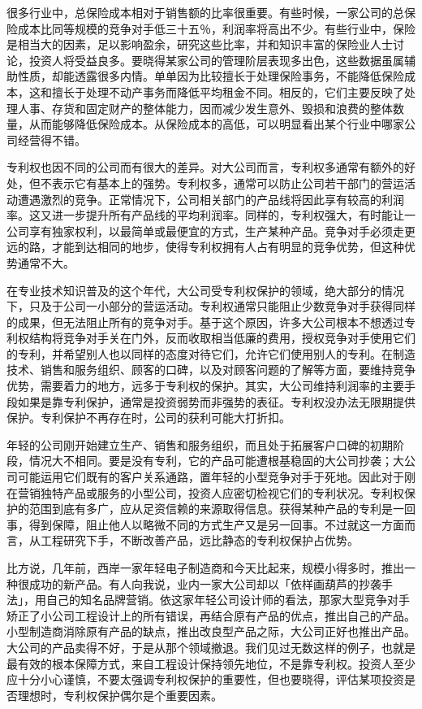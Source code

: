 \documentclass[UTF8,a4paper,zihao=-4,fontset = windows]{ctexart} %
\begin{document}
很多行业中，总保险成本相对于销售额的比率很重要。有些时候，一家公司的总保险成本比同等规模的竞争对手低三十五％，利润率将高出不少。有些行业中，保险是相当大的因素，足以影响盈余，研究这些比率，并和知识丰富的保险业人士讨论，投资人将受益良多。要晓得某家公司的管理阶层表现多出色，这些数据虽属辅助性质，却能透露很多内情。单单因为比较擅长于处理保险事务，不能降低保险成本，这和擅长于处理不动产事务而降低平均租金不同。相反的，它们主要反映了处理人事、存货和固定财产的整体能力，因而减少发生意外、毁损和浪费的整体数量，从而能够降低保险成本。从保险成本的高低，可以明显看出某个行业中哪家公司经营得不错。

专利权也因不同的公司而有很大的差异。对大公司而言，专利权多通常有额外的好处，但不表示它有基本上的强势。专利权多，通常可以防止公司若干部门的营运活动遭遇激烈的竞争。正常情况下，公司相关部门的产品线将因此享有较高的利润率。这又进一步提升所有产品线的平均利润率。同样的，专利权强大，有时能让一公司享有独家权利，以最简单或最便宜的方式，生产某种产品。竞争对手必须走更远的路，才能到达相同的地步，使得专利权拥有人占有明显的竞争优势，但这种优势通常不大。

在专业技术知识普及的这个年代，大公司受专利权保护的领域，绝大部分的情况下，只及于公司一小部分的营运活动。专利权通常只能阻止少数竞争对手获得同样的成果，但无法阻止所有的竞争对手。基于这个原因，许多大公司根本不想透过专利权结构将竞争对手关在门外，反而收取相当低廉的费用，授权竞争对手使用它们的专利，并希望别人也以同样的态度对待它们，允许它们使用别人的专利。在制造技术、销售和服务组织、顾客的口碑，以及对顾客问题的了解等方面，要维持竞争优势，需要着力的地方，远多于专利权的保护。其实，大公司维持利润率的主要手段如果是靠专利保护，通常是投资弱势而非强势的表征。专利权没办法无限期提供保护。专利保护不再存在时，公司的获利可能大打折扣。

年轻的公司刚开始建立生产、销售和服务组织，而且处于拓展客户口碑的初期阶段，情况大不相同。要是没有专利，它的产品可能遭根基稳固的大公司抄袭；大公司可能运用它们既有的客户关系通路，置年轻的小型竞争对手于死地。因此对于刚在营销独特产品或服务的小型公司，投资人应密切检视它们的专利状况。专利权保护的范围到底有多广，应从足资信赖的来源取得信息。获得某种产品的专利是一回事，得到保障，阻止他人以略微不同的方式生产又是另一回事。不过就这一方面而言，从工程研究下手，不断改善产品，远比静态的专利权保护占优势。

比方说，几年前，西岸一家年轻电子制造商和今天比起来，规模小得多时，推出一种很成功的新产品。有人向我说，业内一家大公司却以「依样画葫芦的抄袭手法」，用自己的知名品牌营销。依这家年轻公司设计师的看法，那家大型竞争对手矫正了小公司工程设计上的所有错误，再结合原有产品的优点，推出自己的产品。小型制造商消除原有产品的缺点，推出改良型产品之际，大公司正好也推出产品。大公司的产品卖得不好，于是从那个领域撤退。我们见过无数这样的例子，也就是最有效的根本保障方式，来自工程设计保持领先地位，不是靠专利权。投资人至少应十分小心谨慎，不要太强调专利权保护的重要性，但也要晓得，评估某项投资是否理想时，专利权保护偶尔是个重要因素。
\\
\end{document}
